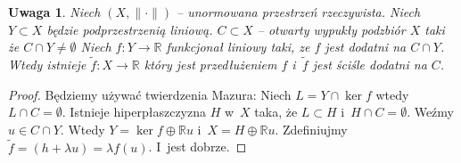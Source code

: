 \documentclass[11pt]{mwrep}
\renewcommand{\[}{\begin{equation}}
\renewcommand{\]}{\end{equation}}
\newcommand{\R}{{\ensuremath{\mathbb R}}}
\newcommand{\norm}{\|\cdot\|}
\newtheorem{uwaga}[subsection]{Uwaga}
\begin{document}
\begin{uwaga}
	Niech $(X,\norm)$ -- unormowana przestrzeń rzeczywista. Niech $Y\subset X$ będzie podprzestrzenią liniową.
	$C\subset X$ -- otwarty wypukły podzbiór $X$ taki że $C \cap Y \not = \emptyset $ Niech $f:Y\to \R$ funkcjonał liniowy taki, ze  
	$f$ jest dodatni na $C\cap Y$. Wtedy istnieje $\tilde{f} : X \to \R$ który jest przedłużeniem $f$ i~$\tilde{f}$ jest ściśle dodatni na $C$.
\end{uwaga}
\begin{proof}
	Będziemy używać twierdzenia Mazura: Niech $L= Y \cap \ker f$ wtedy $L\cap C = \emptyset$. 
	Istnieje hiperpłaszczyzna $H$ w~$X$ taka, że $L\subset H$ i~$H\cap C = \emptyset$.
	Weźmy $u \in C \cap Y$. Wtedy $Y = \ker f \oplus \R u$ i~$X = H\oplus \R u$.
	Zdefiniujmy $\tilde{f} = (h+\lambda u) = \lambda f(u)$. I~jest dobrze. 
\end{proof}
\end{document}

